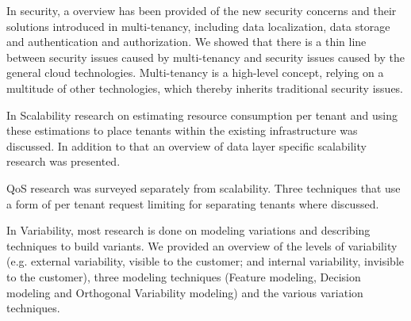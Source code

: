 \documentclass{article}
\begin{document}
In security, a overview  has been provided of the new security concerns and their solutions introduced in multi-tenancy, including data localization, data storage and authentication and authorization. We showed that there is a thin line between security issues caused by multi-tenancy and security issues caused by the general cloud technologies. Multi-tenancy is a high-level concept, relying on a multitude of other technologies, which thereby inherits traditional security issues.  

In Scalability research on estimating resource consumption per tenant and using these estimations to place tenants within the existing infrastructure was discussed. In addition to that an overview of data layer specific scalability research was presented.

\ac{QoS} research was surveyed separately from scalability. Three techniques that use a form of per tenant request limiting for separating tenants where discussed.

In Variability, most research is done on modeling variations and describing techniques to build variants. We provided an overview of the levels of variability (e.g. external variability, visible to the customer; and internal variability, invisible to the customer), three modeling techniques (Feature modeling, Decision modeling and Orthogonal Variability modeling) and the various variation techniques.
\end{document}
